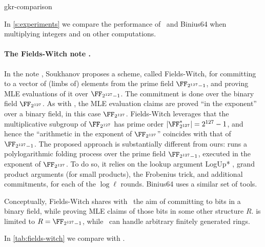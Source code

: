 \begin{lncsappendix}{gkr-comparison}

        
        In \cref{s:experiments} we compare the performance of \ftwoz \ and Binius64 when multiplying integers and on other computations.  


        
        \paragraph{The Fields-Witch note \cite{lev}.} In the note \cite{lev}, Soukhanov proposes a scheme, called Fields-Witch, for committing to a vector of (limbs of) elements from the prime field $\FF_{2^{127}-1}$, and proving MLE evaluations of it over $\FF_{2^{127}-1}$. The commitment is done over   the binary field $\FF_{2^{127}}$. As with \ftwoz, the  MLE evaluation claims are proved ``in the exponent'' over a binary field, in this case $\FF_{2^{127}}$. Fields-Witch leverages that  the multiplicative subgroup of  $\FF_{2^{127}}$ has prime order $|\FF_{2^{127}}^*| = 2^{127}-1$, and hence the ``arithmetic in the exponent of $\FF_{2^{127}}$'' coincides with that of  $\FF_{2^{127}-1}$. The proposed approach is substantially different from ours: \cite{lev}  runs a polylogarithmic folding process over the prime field $\FF_{2^{127}-1}$, executed in the exponent of $\FF_{2^{127}}$. To do so, it relies on  the lookup argument LogUp* \cite{logupstar}, grand product arguments (for small products), the Frobenius trick, and additional commitments, for each of the $\log\ell$ rounds. Binius64 uses a similar set of tools. 
        
        
        Conceptually, Fields-Witch \cite{lev} shares with \ftwoz \ the aim of committing to bits in a binary field, while proving MLE claims of those bits in some other structure $R$.  \cite{lev} is limited to $R=\FF_{2^{127}-1}$, while \ftwoz \ can handle arbitrary finitely generated rings. %
     
 In \cref{tab:fields-witch} we compare \cite{lev} with \ftwoz.
        
\end{lncsappendix}

